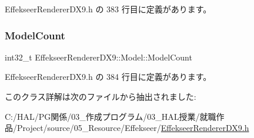  Effekseer\+Renderer\+D\+X9.\+h の 383 行目に定義があります。

\mbox{\label{class_effekseer_renderer_d_x9_1_1_model_a993f041558265db631654723ca973e0a}} 
\subsubsection{\texorpdfstring{Model\+Count}{ModelCount}}
{\footnotesize\ttfamily int32\+\_\+t Effekseer\+Renderer\+D\+X9\+::\+Model\+::\+Model\+Count}



 Effekseer\+Renderer\+D\+X9.\+h の 384 行目に定義があります。



このクラス詳解は次のファイルから抽出されました\+:\begin{DoxyCompactItemize}
\item 
C\+:/\+H\+A\+L/\+P\+G関係/03\+\_\+作成プログラム/03\+\_\+\+H\+A\+L授業/就職作品/\+Project/source/05\+\_\+\+Resource/\+Effekseer/\mbox{\hyperlink{_effekseer_renderer_d_x9_8h}{Effekseer\+Renderer\+D\+X9.\+h}}\end{DoxyCompactItemize}
